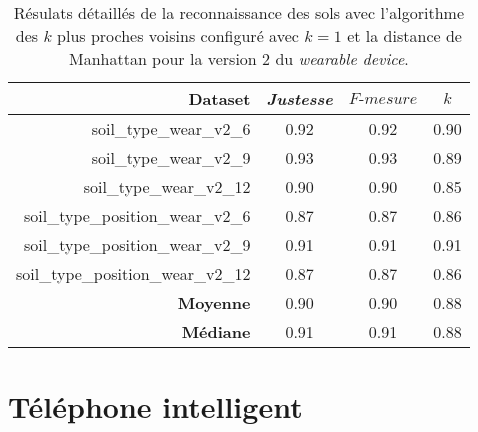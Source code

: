 \begin{table}[H]\renewcommand{\arraystretch}{0.5}
	\centering
	\caption{Résulats détaillés de la reconnaissance des sols avec l'algorithme des $k$ plus proches voisins configuré avec $k=1$ et la distance de Manhattan pour la version 2 du \textit{wearable device}.}
	\label{tab:tab:knn-dM-wear-v2}
	\begin{tabular}{@{}rccc@{}}
		\toprule
			\textbf{Dataset} & \textit{Justesse} & $F\mbox{-} mesure$ & \textbf{$k$} \\
		\midrule
			soil\_type\_wear\_v2\_6 & 0.92 & 0.92 & 0.90 \\
			soil\_type\_wear\_v2\_9 & 0.93 & 0.93 & 0.89 \\
			soil\_type\_wear\_v2\_12 & 0.90 & 0.90 & 0.85 \\
			soil\_type\_position\_wear\_v2\_6 & 0.87 & 0.87 & 0.86 \\
			soil\_type\_position\_wear\_v2\_9 & 0.91 & 0.91 & 0.91 \\
			soil\_type\_position\_wear\_v2\_12 & 0.87 & 0.87 & 0.86 \\
			\textbf{Moyenne} & 0.90 & 0.90 & 0.88 \\
			\textbf{Médiane} & 0.91 & 0.91 & 0.88 \\
		\bottomrule
	\end{tabular}
\end{table}

\section{Téléphone intelligent}


